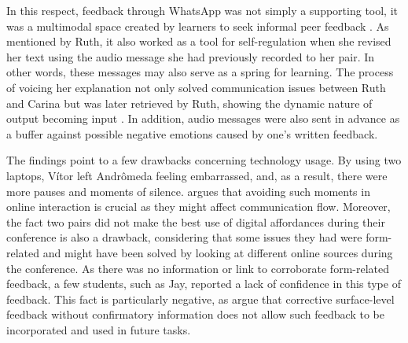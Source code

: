 \documentclass[english]{textolivre}
\begin{document}
In this respect, feedback through WhatsApp was not simply a supporting tool, it was a multimodal space created by learners to seek informal peer feedback \cite{yang2021feedback}. As mentioned by Ruth, it also worked as a tool for self-regulation when she revised her text using the audio message she had previously recorded to her pair. In other words, these messages may also serve as a spring for learning. The process of voicing her explanation not only solved communication issues between Ruth and Carina but was later retrieved by Ruth, showing the dynamic nature of output becoming input \cite{newlondon1996}. In addition, audio messages were also sent in advance as a buffer against possible negative emotions caused by one's written feedback.

The findings point to a few drawbacks concerning technology usage. By using two laptops, Vítor left Andrômeda feeling embarrassed, and, as a result, there were more pauses and moments of silence. \textcite{belda2021enhancing} argues that avoiding such moments in online interaction is crucial as they might affect communication flow. Moreover, the fact two pairs did not make the best use of digital affordances during their conference is also a drawback, considering that some issues they had were form-related and might have been solved by looking at different online sources during the conference. As there was no information or link to corroborate form-related feedback, a few students, such as Jay, reported a lack of confidence in this type of feedback. This fact is particularly negative, as \textcite{hattie2007power} argue that corrective surface-level feedback without confirmatory information does not allow such feedback to be incorporated and used in future tasks.
\end{document}
